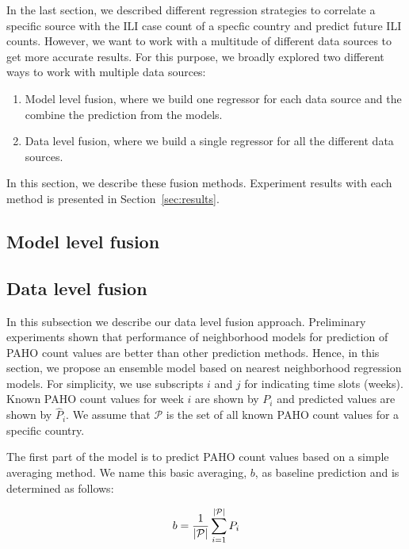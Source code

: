 
In the last section, we described different regression strategies to correlate a specific source with the ILI case count of a specfic country and predict future ILI counts. However, we want to work with a multitude of different data sources to get more accurate results. For this purpose, we broadly explored two different ways to work with multiple data sources:

\begin{enumerate}
  \item Model level fusion, where we build one regressor for each data source and 
    the combine the prediction from the models.
  \item Data level fusion, where we build a single regressor for all the different data
    sources.
\end{enumerate}

In this section, we describe these fusion methods. Experiment results with each method is presented in Section~\ref{sec:results}.

\subsection{Model level fusion}

\subsection{Data level fusion}
In this subsection we describe our data level fusion approach. Preliminary experiments shown that performance of neighborhood models for prediction of PAHO count values are better than other prediction methods. Hence, in this section, we propose an ensemble model based on nearest neighborhood regression models. For simplicity, we use subscripts $i$ and $j$ for indicating time slots (weeks). Known PAHO count values for week $i$ are shown by $P_{i}$ and predicted values are shown by $\hat{P}_{i}$. We assume that $\mathcal{P}$ is the set of all known PAHO count values for a specific country.

The first part of the model is to predict PAHO count values based on a simple averaging method. We name this basic averaging, $b$, as baseline prediction and is determined as follows:

\begin{equation}
b = {1 \over {|\mathcal{P}|}} \sum_{i=1}^{|\mathcal{P}|}P_{i}
\end{equation}

